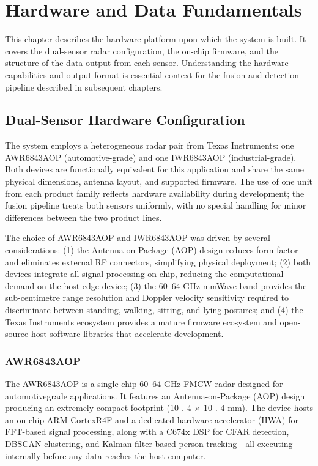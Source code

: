\chapter{Hardware and Data Fundamentals}



This chapter describes the hardware platform upon which the system is built. It covers the dual-sensor radar configuration, the on-chip firmware, and the structure of the data output from each sensor. Understanding the hardware capabilities and output format is essential context for the fusion and detection pipeline described in subsequent chapters. 

\section{Dual-Sensor Hardware Configuration}

The system employs a heterogeneous radar pair from Texas Instruments: one AWR6843AOP (automotive-grade) and one IWR6843AOP (industrial-grade). Both devices are functionally equivalent for this application and share the same physical dimensions, antenna layout, and supported firmware. The use of one unit from each product family reflects hardware availability during development; the fusion pipeline treats both sensors uniformly, with no special handling for minor differences between the two product lines. 

The choice of AWR6843AOP and IWR6843AOP was driven by several considerations: (1) the Antenna-on-Package (AOP) design reduces form factor and eliminates external RF connectors, simplifying physical deployment; (2) both devices integrate all signal processing on-chip, reducing the computational demand on the host edge device; (3) the 60--64 GHz mmWave band provides the sub-centimetre range resolution and Doppler velocity sensitivity required to discriminate between standing, walking, sitting, and lying postures; and (4) the Texas Instruments ecosystem provides a mature firmware ecosystem and open-source host software libraries that accelerate development. 


\subsection{AWR6843AOP}

The AWR6843AOP is a single-chip 60--64 GHz FMCW radar designed for automotivegrade applications. It features an Antenna-on-Package (AOP) design producing an extremely compact footprint (10 \textit{.} 4 \textit{$\times$} 10 \textit{.} 4 mm). The device hosts an on-chip ARM CortexR4F and a dedicated hardware accelerator (HWA) for FFT-based signal processing, along with a C674x DSP for CFAR detection, DBSCAN clustering, and Kalman filter-based person tracking---all executing internally before any data reaches the host computer. 

